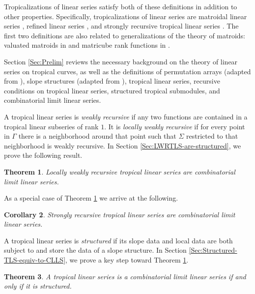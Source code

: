 \documentclass{amsart}
\newtheorem{theorem}{Theorem}[section]
\newtheorem{corollary}[theorem]{Corollary}
\begin{document}
	Tropicalizations of linear series satisfy both of these definitions in addition to other properties. Specifically, tropicalizations of linear series are matroidal linear series \cite[Theorem~1.7]{chang2025matroidal}, refined linear series \cite[Theorem~1.7]{amini2022limit}, and strongly recursive tropical linear series \cite[Section~6]{farkas2025kodairadimensionsoverlinemathcalm22overlinemathcalm23}. The first two definitions are also related to generalizations of the theory of matroids: valuated matroids in \cite{chang2025matroidal} and matricube rank functions in \cite{amini2024combinatorial}.
	
	Section \ref{Sec:Prelim} reviews the necessary background on the theory of linear series on tropical curves, as well as the definitions of permutation arrays (adapted from \cite{eriksson2000combinatorial}), slope structures (adapted from \cite{amini2022limit}), tropical linear series, recursive conditions on tropical linear series, structured tropical submodules, and combinatorial limit linear series.
	
	A tropical linear series is \textit{weakly recursive} if any two functions are contained in a tropical linear subseries of rank $1$. It is \textit{locally weakly recursive} if for every point in $\Gamma$ there is a neighborhood around that point such that $\Sigma$ restricted to that neighborhood is weakly recursive. In Section \ref{Sec:LWRTLS-are-structured}, we prove the following result.
	
	\begin{theorem}
		\label{Thm:lwrtls-are-structured}
		Locally weakly recursive tropical linear series are combinatorial limit linear series.
	\end{theorem}
	
	As a special case of Theorem \ref{Thm:lwrtls-are-structured} we arrive at the following.
	
	\begin{corollary}
		\label{Cor:SRTLS-are-structured}
		Strongly recursive tropical linear series are combinatorial limit linear series.
	\end{corollary}
	
	A tropical linear series is \textit{structured} if its slope data and local data are both subject to and store the data of a slope structure. In Section \ref{Sec:Structured-TLS-equiv-to-CLLS}, we prove a key step toward Theorem \ref{Thm:lwrtls-are-structured}.
	
	\begin{theorem}
		\label{Thm:Structured-TLS-equiv-CLLS}
		A tropical linear series is a combinatorial limit linear series if and only if it is structured.
	\end{theorem}
	
\end{document}
